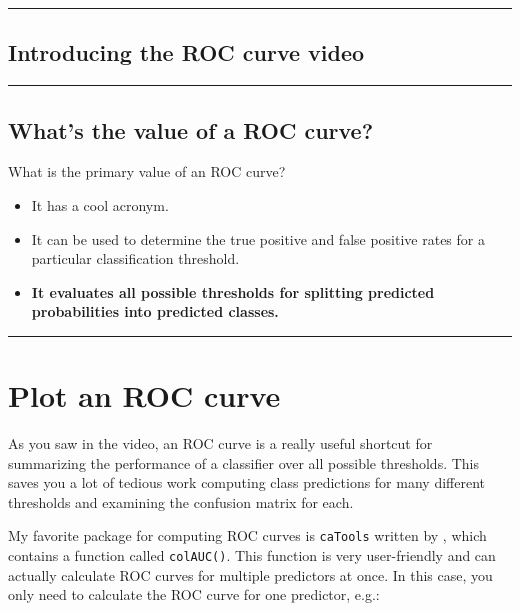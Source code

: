 \documentclass[
]{book}
\begin{document}
\begin{center}\rule{0.5\linewidth}{0.5pt}\end{center}

\hypertarget{introducing-the-roc-curve-video}{%
\subsection*{Introducing the ROC curve video}\label{introducing-the-roc-curve-video}}

\begin{center}\rule{0.5\linewidth}{0.5pt}\end{center}

\hypertarget{whats-the-value-of-a-roc-curve}{%
\subsection*{What's the value of a ROC curve?}\label{whats-the-value-of-a-roc-curve}}

What is the primary value of an ROC curve?

\begin{itemize}
\item
  It has a cool acronym.
\item
  It can be used to determine the true positive and false positive rates for a particular classification threshold.
\item
  \textbf{It evaluates all possible thresholds for splitting predicted probabilities into predicted classes.}
\end{itemize}

\begin{center}\rule{0.5\linewidth}{0.5pt}\end{center}

\hypertarget{plot-an-roc-curve}{%
\section{Plot an ROC curve}\label{plot-an-roc-curve}}

As you saw in the video, an ROC curve is a really useful shortcut for summarizing the performance of a classifier over all possible thresholds. This saves you a lot of tedious work computing class predictions for many different thresholds and examining the confusion matrix for each.

My favorite package for computing ROC curves is \texttt{caTools} written by \citet{R-caTools}, which contains a function called \texttt{colAUC()}. This function is very user-friendly and can actually calculate ROC curves for multiple predictors at once. In this case, you only need to calculate the ROC curve for one predictor, e.g.:
\end{document}
